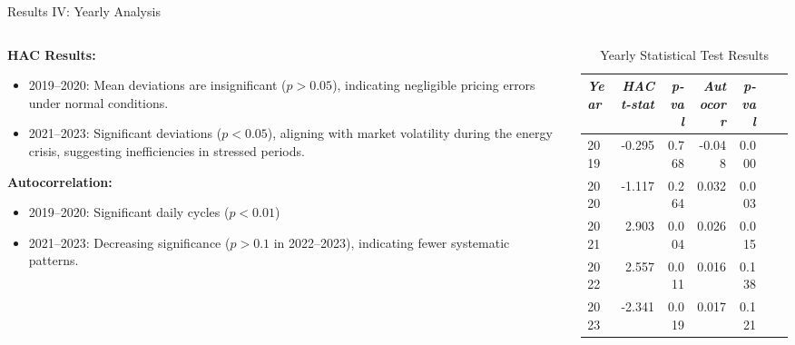\documentclass[aspectratio=169,xcolor=dvipsnames]{beamer}
\begin{document}
\begin{frame}{Results IV: Yearly Analysis}
\begin{columns}
    \begin{column}{0.5\textwidth}
    {\footnotesize
            \textbf{HAC Results:}
            \begin{itemize}
                \item 2019–2020: Mean deviations are insignificant ($p > 0.05$), indicating negligible pricing errors under normal conditions.
                \item 2021–2023: Significant deviations ($p < 0.05$), aligning with market volatility during the energy crisis, suggesting inefficiencies in stressed periods.
            \end{itemize}
            \textbf{Autocorrelation:}
            \begin{itemize}
                \item 2019–2020: Significant daily cycles ($p < 0.01$)
                \item 2021–2023: Decreasing significance ($p > 0.1$ in 2022–2023), indicating fewer systematic patterns.
            \end{itemize}}
    \end{column}

    \begin{column}{0.5\textwidth}
        \centering
        \scriptsize
        \begin{table}[ht]
           \caption{Yearly Statistical Test Results}
           \label{tab:yearly_test_results}
           \begin{tabular}{l|rr|rr|rr}
               \hline
               \textit{Year} & \textit{HAC t-stat} & \textit{p-val} & \textit{Autocorr} & \textit{p-val} \\
               \hline
               2019 & -0.295 & 0.768 & -0.048 & 0.000 \\
               2020 & -1.117 & 0.264 &  0.032 & 0.003 \\
               2021 &  2.903 & 0.004 &  0.026 & 0.015 \\
               2022 &  2.557 & 0.011 &  0.016 & 0.138 \\
               2023 & -2.341 & 0.019 &  0.017 & 0.121 \\
               \hline
           \end{tabular}
        \end{table}
    \end{column}
\end{columns}
\end{frame}
\end{document}
